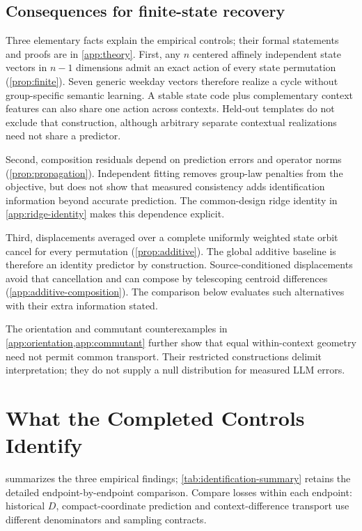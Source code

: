 \documentclass[10pt]{article}
\begin{document}
\subsection{Consequences for finite-state recovery}
Three elementary facts explain the empirical controls; their formal statements and proofs are in \cref{app:theory}. First, any $n$ centered affinely independent state vectors in $n-1$ dimensions admit an exact action of every state permutation (\cref{prop:finite}). Seven generic weekday vectors therefore realize a cycle without group-specific semantic learning. A stable state code plus complementary context features can also share one action across contexts. Held-out templates do not exclude that construction, although arbitrary separate contextual realizations need not share a predictor.

Second, composition residuals depend on prediction errors and operator norms (\cref{prop:propagation}). Independent fitting removes group-law penalties from the objective, but does not show that measured consistency adds identification information beyond accurate prediction. The common-design ridge identity in \cref{app:ridge-identity} makes this dependence explicit.

Third, displacements averaged over a complete uniformly weighted state orbit cancel for every permutation (\cref{prop:additive}). The global additive baseline is therefore an identity predictor by construction. Source-conditioned displacements avoid that cancellation and can compose by telescoping centroid differences (\cref{app:additive-composition}). The comparison below evaluates such alternatives with their extra information stated.

The orientation and commutant counterexamples in \cref{app:orientation,app:commutant} further show that equal within-context geometry need not permit common transport. Their restricted constructions delimit interpretation; they do not supply a null distribution for measured LLM errors.

\section{What the Completed Controls Identify}
\label{sec:evidence}
 summarizes the three empirical findings; \cref{tab:identification-summary} retains the detailed endpoint-by-endpoint comparison. Compare losses within each endpoint: historical $D$, compact-coordinate prediction and context-difference transport use different denominators and sampling contracts.
\end{document}
